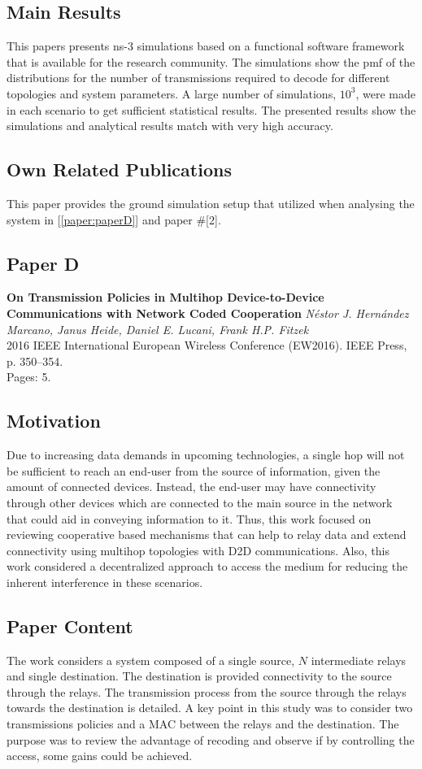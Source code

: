 \subsection*{Main Results}
This papers presents ns-3 simulations based on a functional software framework that is available for the research community. The simulations show the \ac{pmf} of the distributions for the number of transmissions required to decode for different topologies and system parameters. A large number of simulations, $10^3$, were made in each scenario to get sufficient statistical results. The presented results show the simulations and analytical results match with very high accuracy.

\subsection*{Own Related Publications}
This paper provides the ground simulation setup that utilized when analysing the system in [\ref{paper:paperD}] and paper \#[2].

\clearpage

\subsection{Paper D}
\textbf{On Transmission Policies in Multihop Device-to-Device Communications
with Network Coded Cooperation}
\textit{N\'estor J. Hern\'andez Marcano, Janus Heide, Daniel E. Lucani, Frank H.P. Fitzek}
\\  2016 IEEE International European Wireless Conference (EW2016). IEEE Press, p. 350--354.
\\ Pages: 5.
\subsection*{Motivation}
Due to increasing data demands in upcoming technologies, a single hop will not be sufficient to reach an end-user from the source of information, given the amount of connected devices. Instead, the end-user may have connectivity through other devices which are connected to the main source in the network that could aid in conveying information to it. Thus, this work focused on reviewing cooperative based mechanisms that can help to relay data and extend connectivity using multihop topologies with \ac{D2D} communications. Also, this work considered a decentralized approach to access the medium for reducing the inherent interference in these scenarios.

 \subsection*{Paper Content}
The work considers a system composed of a single source, $N$ intermediate relays and single destination. The destination is provided connectivity to the source through the relays. The transmission process from the source through the relays towards the destination is detailed. A key point in this study was to consider two transmissions policies and a \ac{MAC} between the relays and the destination. The purpose was to review the advantage of recoding and observe if by controlling the access, some gains could be achieved.

